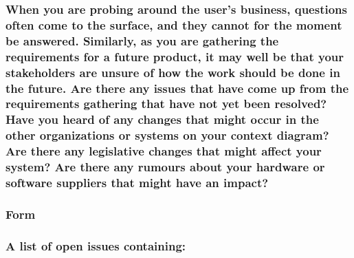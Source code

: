 \documentclass[
]{article}
\begin{document}
\hypertarget{when-you-are-probing-around-the-users-business-questions-often-come-to-the-surface-and-they-cannot-for-the-moment-be-answered.-similarly-as-you-are-gathering-the-requirements-for-a-future-product-it-may-well-be-that-your-stakeholders-are-unsure-of-how-the-work-should-be-done-in-the-future.-are-there-any-issues-that-have-come-up-from-the-requirements-gathering-that-have-not-yet-been-resolved-have-you-heard-of-any-changes-that-might-occur-in-the-other-organizations-or-systems-on-your-context-diagram-are-there-any-legislative-changes-that-might-affect-your-system-are-there-any-rumours-about-your-hardware-or-software-suppliers-that-might-have-an-impact}{%
\subsubsection{When you are probing around the user's business,
questions often come to the surface, and they cannot for the moment be
answered. Similarly, as you are gathering the requirements for a future
product, it may well be that your stakeholders are unsure of how the
work should be done in the future. Are there any issues that have come
up from the requirements gathering that have not yet been resolved? Have
you heard of any changes that might occur in the other organizations or
systems on your context diagram? Are there any legislative changes that
might affect your system? Are there any rumours about your hardware or
software suppliers that might have an
impact?}\label{when-you-are-probing-around-the-users-business-questions-often-come-to-the-surface-and-they-cannot-for-the-moment-be-answered.-similarly-as-you-are-gathering-the-requirements-for-a-future-product-it-may-well-be-that-your-stakeholders-are-unsure-of-how-the-work-should-be-done-in-the-future.-are-there-any-issues-that-have-come-up-from-the-requirements-gathering-that-have-not-yet-been-resolved-have-you-heard-of-any-changes-that-might-occur-in-the-other-organizations-or-systems-on-your-context-diagram-are-there-any-legislative-changes-that-might-affect-your-system-are-there-any-rumours-about-your-hardware-or-software-suppliers-that-might-have-an-impact}}

\hypertarget{form-29}{%
\subsubsection{Form}\label{form-29}}

\hypertarget{a-list-of-open-issues-containing}{%
\subsubsection{\texorpdfstring{A list of open issues containing:
}{A list of open issues containing: }}\label{a-list-of-open-issues-containing}}
\end{document}
